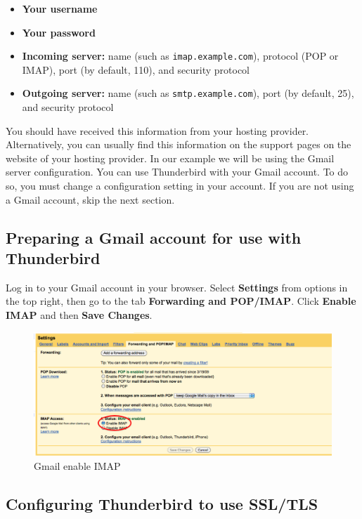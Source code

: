 \begin{itemize}
\item
  \textbf{Your username}
\item
  \textbf{Your password}
\item
  \textbf{Incoming server:} name (such as \verb!imap.example.com!),
  protocol (POP or IMAP), port (by default, 110), and security protocol
\item
  \textbf{Outgoing server:} name (such as \verb!smtp.example.com!), port
  (by default, 25), and security protocol
\end{itemize}
You should have received this information from your hosting provider.
Alternatively, you can usually find this information on the support
pages on the website of your hosting provider. In our example we will be
using the Gmail server configuration. You can use Thunderbird with your
Gmail account. To do so, you must change a configuration setting in your
account. If you are not using a Gmail account, skip the next section.

\subsection{Preparing a Gmail account for use with Thunderbird}

Log in to your Gmail account in your browser. Select \textbf{Settings}
from options in the top right, then go to the tab \textbf{Forwarding and
POP/IMAP}. Click \textbf{Enable IMAP} and then \textbf{Save Changes}.

\begin{figure}[htbp]
\centering
\includegraphics{gmail_imap.png}
\caption{Gmail enable IMAP}
\end{figure}

\subsection{Configuring Thunderbird to use SSL/TLS}

